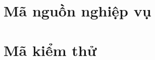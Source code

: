 \documentclass[12pt,a4paper,oneside]{report}
\begin{document}
\chapter{Mã nguồn nghiệp vụ}







\chapter{Mã kiểm thử}

\end{document}
